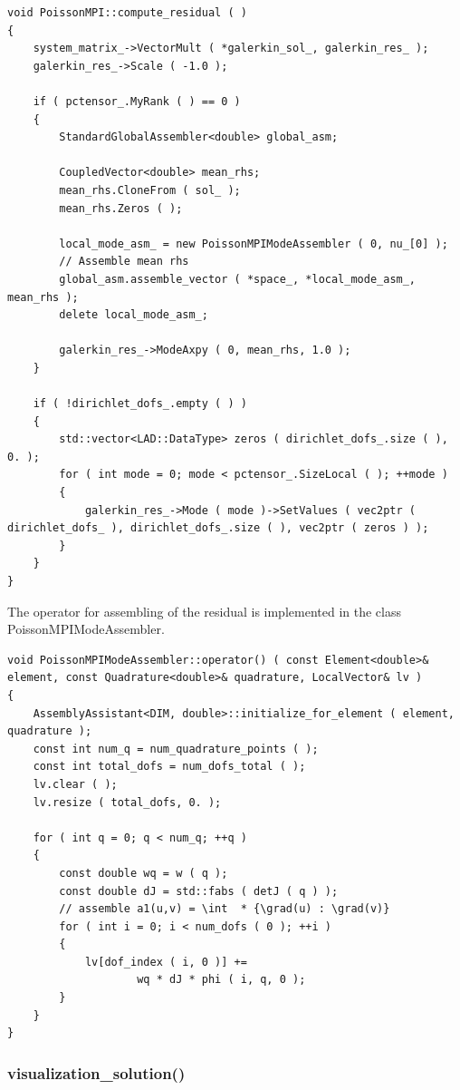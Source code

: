 \documentclass{article}
\begin{document}
\begin{lstlisting}
void PoissonMPI::compute_residual ( )
{
    system_matrix_->VectorMult ( *galerkin_sol_, galerkin_res_ );
    galerkin_res_->Scale ( -1.0 );

    if ( pctensor_.MyRank ( ) == 0 )
    {
        StandardGlobalAssembler<double> global_asm;

        CoupledVector<double> mean_rhs;
        mean_rhs.CloneFrom ( sol_ );
        mean_rhs.Zeros ( );

        local_mode_asm_ = new PoissonMPIModeAssembler ( 0, nu_[0] );
        // Assemble mean rhs
        global_asm.assemble_vector ( *space_, *local_mode_asm_, mean_rhs );
        delete local_mode_asm_;

        galerkin_res_->ModeAxpy ( 0, mean_rhs, 1.0 );
    }

    if ( !dirichlet_dofs_.empty ( ) )
    {
        std::vector<LAD::DataType> zeros ( dirichlet_dofs_.size ( ), 0. );
        for ( int mode = 0; mode < pctensor_.SizeLocal ( ); ++mode )
        {
            galerkin_res_->Mode ( mode )->SetValues ( vec2ptr ( dirichlet_dofs_ ), dirichlet_dofs_.size ( ), vec2ptr ( zeros ) );
        }
    }
}
\end{lstlisting}

The operator for assembling of the residual is implemented in the class PoissonMPIModeAssembler.

\begin{lstlisting}
void PoissonMPIModeAssembler::operator() ( const Element<double>& element, const Quadrature<double>& quadrature, LocalVector& lv )
{
    AssemblyAssistant<DIM, double>::initialize_for_element ( element, quadrature );
    const int num_q = num_quadrature_points ( );
    const int total_dofs = num_dofs_total ( );
    lv.clear ( );
    lv.resize ( total_dofs, 0. );

    for ( int q = 0; q < num_q; ++q )
    {
        const double wq = w ( q );
        const double dJ = std::fabs ( detJ ( q ) );
        // assemble a1(u,v) = \int  * {\grad(u) : \grad(v)}
        for ( int i = 0; i < num_dofs ( 0 ); ++i )
        {
            lv[dof_index ( i, 0 )] +=
                    wq * dJ * phi ( i, q, 0 );
        }
    }
}
\end{lstlisting}

\subsubsection{visualization\_solution()}
\label{sub:program:subsec:visualization}
\end{document}
